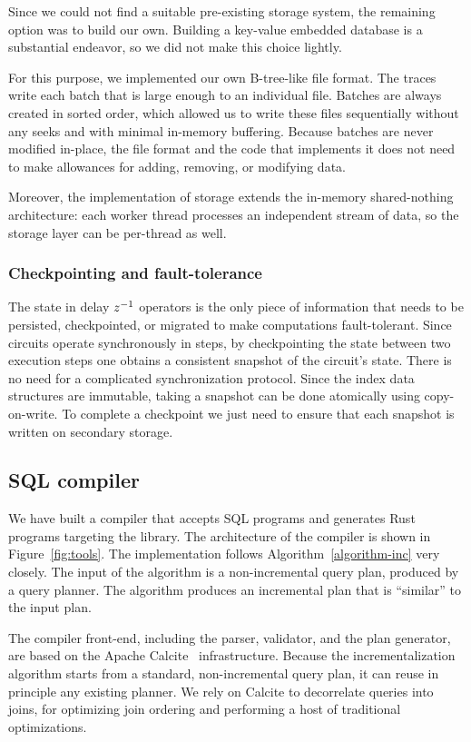 Since we could not find a suitable pre-existing storage system, the
remaining option was to build our own. Building a key-value embedded
database is a substantial endeavor, so we did not make this choice
lightly.

For this purpose, we implemented our own B-tree-like file format. The
traces write each batch that is large enough to an individual file.  Batches
are always created in sorted order, which allowed us to write these
files sequentially without any seeks and with minimal in-memory
buffering.  Because batches are never modified in-place, the file
format and the code that implements it does not need to make
allowances for adding, removing, or modifying data.

Moreover, the implementation of storage extends the in-memory
shared-nothing architecture: each worker thread processes an
independent stream of data, so the storage layer can be per-thread as
well.

\subsubsection{Checkpointing and fault-tolerance}

The state in delay $z^{-1}$ operators is the only piece of information
that needs to be persisted, checkpointed, or migrated to make \dbsp
computations fault-tolerant.  Since \dbsp circuits operate
synchronously in steps, by checkpointing the state between two
execution steps one obtains a consistent snapshot of the circuit's
state.  There is no need for a complicated synchronization protocol.
Since the index data structures are immutable, taking a snapshot can
be done atomically using copy-on-write.  To complete a checkpoint we
just need to ensure that each snapshot is written on secondary
storage.

\subsection{SQL compiler}

We have built a compiler that accepts SQL programs and generates Rust
programs targeting the \dbsp library.  The architecture of the
compiler is shown in Figure~\ref{fig:tools}.  The implementation
follows Algorithm~\ref{algorithm-inc} very closely.  The input of the
algorithm is a non-incremental query plan, produced by a query
planner.  The algorithm produces an incremental plan that is
``similar'' to the input plan.

The compiler front-end, including the parser, validator, and the plan
generator, are based on the Apache Calcite~\cite{begoli-icmd18}
infrastructure.  Because the incrementalization algorithm starts from
a standard, non-incremental query plan, it can reuse in principle any
existing planner.  We rely on Calcite to decorrelate queries into
joins, for optimizing join ordering and performing a host of
traditional optimizations.

